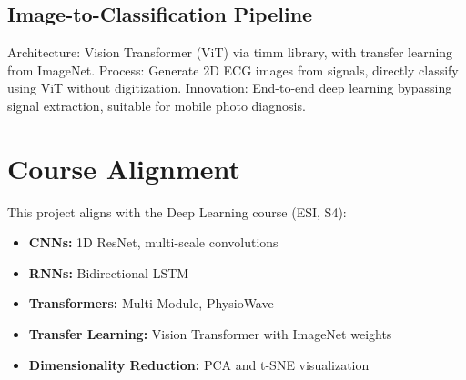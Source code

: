 \subsection{Image-to-Classification Pipeline}
Architecture: Vision Transformer (ViT) via timm library, with transfer learning from ImageNet. Process: Generate 2D ECG images from signals, directly classify using ViT without digitization. Innovation: End-to-end deep learning bypassing signal extraction, suitable for mobile photo diagnosis.

\section{Course Alignment}
This project aligns with the Deep Learning course (ESI, S4):
\begin{itemize}
    \item \textbf{CNNs:} 1D ResNet, multi-scale convolutions
    \item \textbf{RNNs:} Bidirectional LSTM
    \item \textbf{Transformers:} Multi-Module, PhysioWave
    \item \textbf{Transfer Learning:} Vision Transformer with ImageNet weights
    \item \textbf{Dimensionality Reduction:} PCA and t-SNE visualization
\end{itemize}
